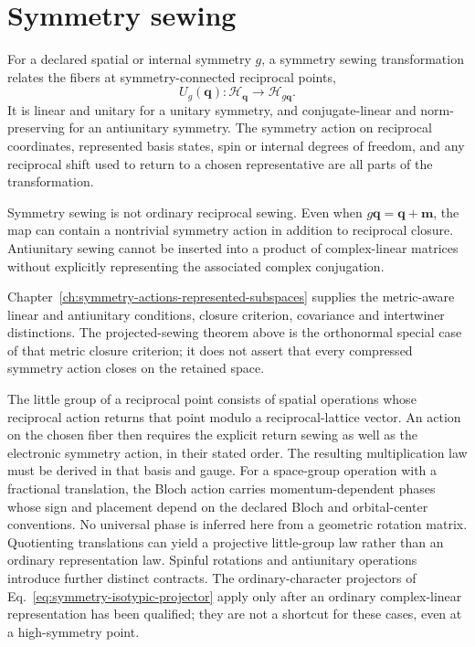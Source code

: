 \section{Symmetry sewing}

\begin{definition}
\label{def:training-symmetry-sewing}
For a declared spatial or internal symmetry \(g\), a symmetry sewing
transformation relates the fibers at symmetry-connected reciprocal points,
\begin{equation}
  U_g(\mathbf q):
  \mathcal H_{\mathbf q}
  \longrightarrow
  \mathcal H_{g\mathbf q}.
\end{equation}
It is linear and unitary for a unitary symmetry, and conjugate-linear and
norm-preserving for an antiunitary symmetry. The symmetry action on reciprocal
coordinates, represented basis states, spin or internal degrees of freedom,
and any reciprocal shift used to return to a chosen representative are all
parts of the transformation.
\end{definition}

Symmetry sewing is not ordinary reciprocal sewing. Even when
\(g\mathbf q=\mathbf q+\mathbf m\), the map can contain a nontrivial symmetry
action in addition to reciprocal closure. Antiunitary sewing cannot be inserted
into a product of complex-linear matrices without explicitly representing the
associated complex conjugation.

Chapter~\ref{ch:symmetry-actions-represented-subspaces} supplies the metric-aware
linear and antiunitary conditions, closure criterion, covariance and
intertwiner distinctions. The projected-sewing theorem above is the
orthonormal special case of that metric closure criterion; it does not assert
that every compressed symmetry action closes on the retained space.

The little group of a reciprocal point consists of spatial operations whose
reciprocal action returns that point modulo a reciprocal-lattice vector.
An action on the chosen fiber then requires the explicit return sewing as
well as the electronic symmetry action, in their stated order. The resulting
multiplication law must be derived in that basis and gauge. For a space-group
operation with a fractional translation, the Bloch action carries
momentum-dependent phases whose sign and placement depend on the declared
Bloch and orbital-center conventions. No universal phase is inferred here
from a geometric rotation matrix. Quotienting translations can yield a
projective little-group law rather than an ordinary representation law.
Spinful rotations and antiunitary operations introduce further distinct
contracts. The ordinary-character projectors of
Eq.~\eqref{eq:symmetry-isotypic-projector} apply only after an ordinary
complex-linear representation has been qualified; they are not a shortcut
for these cases, even at a high-symmetry point.

